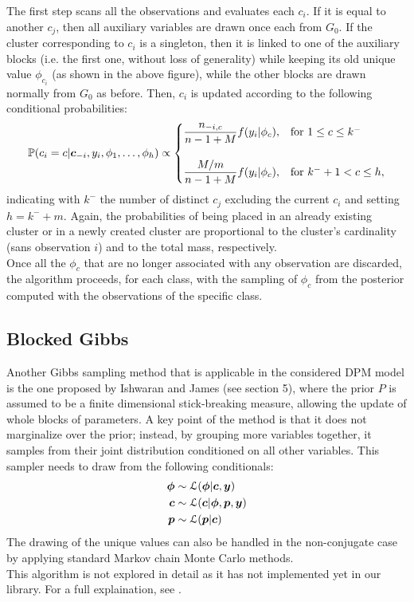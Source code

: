 The first step scans all the observations and evaluates each $c_i$.
If it is equal to another $c_j$, then all auxiliary variables are drawn once each from $G_0$.
If the cluster corresponding to $c_i$ is a singleton, then it is linked to one of the auxiliary blocks (i.e. the first one, without loss of generality) while keeping its old unique value $\phi_{c_i}$ (as shown in the above figure), while the other blocks are drawn normally from $G_0$ as before.
Then, $c_i$ is updated according to the following conditional probabilities:
\begin{equation}
	\begin{aligned} \label{neal8prob}
		\mathbb P(c_{i}=c | \boldsymbol c_{-i}, y_{i}, \phi_{1},\dots,\phi_{h}) \propto
		\begin{cases}
			\dfrac{n_{-i,c}}{n-1+M}f(y_{i}|\phi_{c}), & \mbox{for } 1 \leq c \leq k^{-} \\
			\\
			\dfrac{M/m}{n-1+M}f(y_{i}|\phi_{c}), & \mbox{for } k^{-}+1 < c \leq h,
		\end{cases}
	\end{aligned}
\end{equation}
indicating with $k^{-}$ the number of distinct $c_j$ excluding the current $c_i$ and setting $h=k^{-}+m$.
Again, the probabilities of being placed in an already existing cluster or in a newly created cluster are proportional to the cluster's cardinality (sans observation $i$) and to the total mass, respectively. \\
Once all the $\phi_c$ that are no longer associated with any observation are discarded, the algorithm proceeds, for each class, with the sampling of $\phi_c$ from the posterior computed with the observations of the specific class.

\subsection{Blocked Gibbs}
Another Gibbs sampling method that is applicable in the considered DPM model is the one proposed by Ishwaran and James (see \cite{james} section 5), where the prior $P$ is assumed to be a finite dimensional stick-breaking measure, allowing the update of whole blocks of parameters.
A key point of the method is that it does not marginalize over the prior; instead, by grouping more variables together, it samples from their joint distribution conditioned on all other variables.
This sampler needs to draw from the following conditionals:
\begin{align}
	\boldsymbol\phi &\sim \mathcal L(\boldsymbol\phi | \boldsymbol{c}, \boldsymbol{y}) \nonumber \\
	\boldsymbol{c} &\sim \mathcal L (\boldsymbol{c}| \boldsymbol\phi,\boldsymbol{p}, \boldsymbol{y}) \nonumber \\
	\boldsymbol{p} &\sim \mathcal L (\boldsymbol{p}| \boldsymbol{c}) \nonumber
\end{align}
The drawing of the unique values can also be handled in the non-conjugate case by applying standard Markov chain Monte Carlo methods. \\
This algorithm is not explored in detail as it has not implemented yet in our library.
For a full explaination, see \cite{james}.
